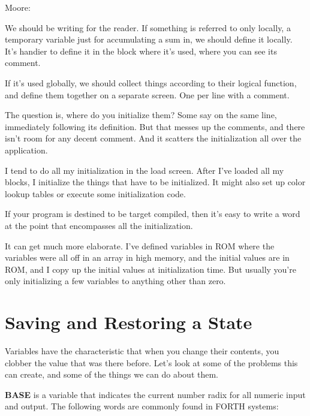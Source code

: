 \begin{interview}
Moore:

\begin{tfquot}
We should be writing for the reader. If something is referred to only locally,
a temporary variable just for accumulating a sum in, we should define it
locally. It's handier to define it in the block where it's used, where you can
see its comment.

If it's used globally, we should collect things according to their logical
function, and define them together on a separate screen. One per line with a
comment.

The question is, where do you initialize them? Some say on the same line,
immediately following its definition. But that messes up the comments,
and there isn't room for any decent comment. And it scatters the
initialization all over the application.

I tend to do all my initialization in the load screen. After I've loaded all my
blocks, I initialize the things that have to be initialized. It might also set
up color lookup tables or execute some initialization code.

If your program is destined to be target compiled, then it's easy to write a
word at the point that encompasses all the initialization.

It can get much more elaborate. I've defined variables in ROM where the
variables were all off in an array in high memory, and the initial values are
in ROM, and I copy up the initial values at initialization time. But usually
you're only initializing a few variables to anything other than zero.
\end{tfquot}
\end{interview}

\section{Saving and Restoring a State}

Variables have the characteristic that when you change their contents,
you clobber the value that was there before. Let's look at some of the
problems this can create, and some of the things we can do about them.

\textbf{BASE} is a variable that indicates the current
number radix for all numeric input and output. The following words are
commonly found in FORTH systems:

